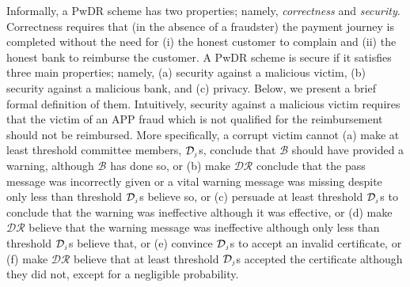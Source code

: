 
\vspace{-1.7mm}
Informally, a PwDR scheme has two  properties; namely, \emph{correctness} and \emph{security}. Correctness requires that (in the absence of a fraudster) the payment journey is completed without the need for (i) the honest customer to complain and (ii)  the honest bank to reimburse the customer.  A PwDR scheme is  secure if it satisfies three main properties; namely, (a) security against a malicious victim, (b) security against a malicious bank, and (c) privacy. Below, we present a brief formal definition of   them. Intuitively, security against a malicious victim requires that the victim of an APP fraud which is not qualified for the reimbursement should not be reimbursed. 
%
More specifically, a corrupt victim cannot (a) make at least threshold committee members, $\mathcal{D}_{\scriptscriptstyle j}$s,  conclude that $\mathcal{B}$ should have provided a warning, although $\mathcal{B}$ has done so, or (b) make $\mathcal{DR}$ conclude that   the pass message was incorrectly given or a vital warning message was missing despite only less than threshold  $\mathcal{D}_{\scriptscriptstyle j}$s  believe so, or (c) persuade at least threshold $\mathcal{D}_{\scriptscriptstyle j}$s to  conclude that the warning was ineffective although it was effective, or (d)  make $\mathcal{DR}$ believe that the warning message was ineffective although only less than threshold $\mathcal{D}_{\scriptscriptstyle j}$s   believe that, or (e)  convince  $\mathcal{D}_{\scriptscriptstyle j}$s to accept an invalid certificate, or  (f) make $\mathcal{DR}$ believe that at least  threshold $\mathcal{D}_{\scriptscriptstyle j}$s accepted the certificate  although they did not, except for a negligible probability.

